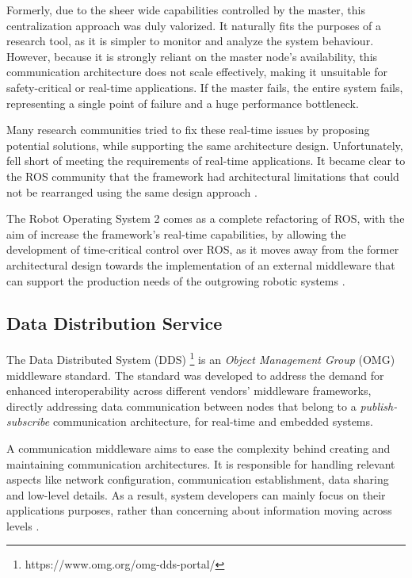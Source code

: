 Formerly, due to the sheer wide capabilities controlled by the master, this centralization approach was duly valorized. It naturally fits the purposes of a research tool, as it is simpler to monitor and analyze the system behaviour. However, because it is strongly reliant on the master node's availability, this communication architecture does not scale effectively, making it unsuitable for safety-critical or real-time applications. If the master fails, the entire system fails, representing a single point of failure and a huge performance bottleneck.

Many research communities tried to fix these real-time issues by proposing potential solutions, while supporting the same architecture design. Unfortunately, fell short of meeting the requirements of real-time applications. It became clear to the ROS community that the framework had architectural limitations that could not be rearranged using the same design approach \cite{maruyama2016exploring, dieber2020penetration}.

The Robot Operating System 2 comes as a complete refactoring of ROS, with the aim of increase the framework's real-time capabilities, by allowing the development of time-critical control over ROS, as it moves away from the former architectural design towards the implementation of an external middleware that can support the production needs of the outgrowing robotic systems \cite{kim2018security, casini2019response}.

\subsection{Data Distribution Service}

The Data Distributed System (DDS) \footnote{https://www.omg.org/omg-dds-portal/} is an \textit{Object Management Group} (OMG) middleware standard. The standard was developed to address the demand for enhanced interoperability across different vendors' middleware frameworks, directly addressing data communication between nodes that belong to a \textit{publish-subscribe} communication architecture, for real-time and embedded systems. 

A communication middleware aims to ease the complexity behind creating and maintaining communication architectures. It is responsible for handling relevant aspects like network configuration, communication establishment, data sharing and low-level details. As a result, system developers can mainly focus on their applications purposes, rather than concerning about information moving across levels \cite{dds-what-is}. 

